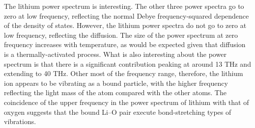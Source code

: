 \documentclass[twoside,twocolumn,9pt]{article}
\begin{document}
The lithium power spectrum is interesting. The other three power spectra go to zero at low frequency, reflecting the normal Debye frequency-squared dependence of the density of states. However, the lithium power spectra do not go to zero at low frequency, reflecting the diffusion. The size of the power spectrum at zero frequency increases with temperature, as would be expected given that diffusion is a thermally-activated process. What is also interesting about the power spectrum is that there is a significant contribution peaking at around 13 THz and extending to 40 THz. Other most of the frequency range, therefore, the lithium ion appears to be vibrating as a bound particle, with the higher frequency reflecting the light mass of the atom compared with the other atoms. The coincidence of the upper frequency in the power spectrum of lithium with that of oxygen suggests that the bound Li--O pair execute bond-stretching types of vibrations.



\end{document}
